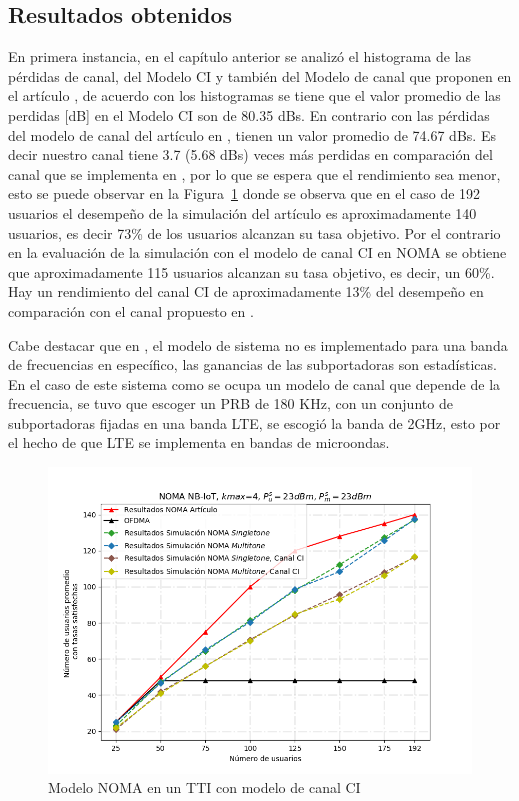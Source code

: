 \subsection{Resultados obtenidos}
En primera instancia, en el capítulo anterior se analizó el histograma de las pérdidas de canal, del Modelo CI y también del Modelo de canal que proponen en el artículo \parencite{Shahini2019} , de acuerdo con los histogramas se tiene que el valor promedio de las perdidas [dB] en el Modelo CI son de 80.35 dBs. En contrario con las pérdidas del modelo de canal del artículo en \parencite{Shahini2019}, tienen un valor promedio de 74.67 dBs. Es decir nuestro canal tiene 3.7 (5.68 dBs) veces más perdidas en comparación del canal que se implementa en \parencite{Shahini2019}, por lo que se espera que el rendimiento sea menor, esto se puede observar en la Figura~\ref{fig:NOMA_comprobacion_CI} donde se observa que en el caso de 192 usuarios el desempeño de la simulación del artículo es aproximadamente 140 usuarios, es decir 73\% de los usuarios alcanzan su tasa objetivo. Por el contrario en la evaluación de la simulación con el modelo de canal CI en NOMA se obtiene que aproximadamente 115 usuarios alcanzan su tasa objetivo, es decir, un 60\%. Hay un rendimiento del canal CI de aproximadamente 13\% del desempeño en comparación con el canal propuesto en \parencite{Shahini2019}.\newline

Cabe destacar que en \parencite{Shahini2019}, el modelo de sistema no es implementado para una banda de frecuencias en específico, las ganancias de las subportadoras son estadísticas. En el caso de este sistema como se ocupa un modelo de canal que depende de la frecuencia, se tuvo que escoger un PRB de 180 KHz, con un conjunto de subportadoras fijadas en una banda LTE, se escogió la banda de 2GHz, esto por el hecho de que LTE se implementa en bandas de microondas. \newline

\begin{figure}[th]
    \centering
    \includegraphics[scale=.7]{Figures/ResultadosNOMA/NOMA_comprobacion_CI.png}
    \decoRule
    \caption[Modelo NOMA en un TTI con modelo de canal CI]{Modelo NOMA en un TTI con modelo de canal CI}
    \label{fig:NOMA_comprobacion_CI}
\end{figure}

